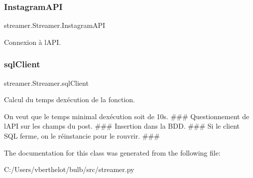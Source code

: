 \subsubsection{\texorpdfstring{Instagram\+A\+PI}{InstagramAPI}}
{\footnotesize\ttfamily streamer.\+Streamer.\+Instagram\+A\+PI}



Connexion à l\textquotesingle{}A\+PI. 

\paragraph*{}\mbox{\label{classstreamer_1_1_streamer_ae7cbab4c93f54faa038805789506e167}} 
\subsubsection{\texorpdfstring{sql\+Client}{sqlClient}}
{\footnotesize\ttfamily streamer.\+Streamer.\+sql\+Client}



Calcul du temps d\textquotesingle{}exécution de la fonction. 

On veut que le temps minimal d\textquotesingle{}exécution soit de 10s. \#\#\# Questionnement de l\textquotesingle{}A\+PI sur les champs du post. \#\#\# Insertion dans la B\+DD. \#\#\# Si le client S\+QL ferme, on le réinstancie pour le rouvrir. \#\#\# 

The documentation for this class was generated from the following file\+:\begin{DoxyCompactItemize}
\item 
C\+:/\+Users/vberthelot/bulb/src/streamer.\+py\end{DoxyCompactItemize}
